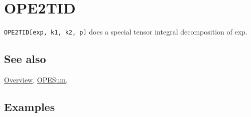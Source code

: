 \documentclass[../FeynCalcManual.tex]{subfiles}
\begin{document}
\hypertarget{ope2tid}{%
\section{OPE2TID}\label{ope2tid}}

\texttt{OPE2TID[\allowbreak{}exp,\ \allowbreak{}k1,\ \allowbreak{}k2,\ \allowbreak{}p]}
does a special tensor integral decomposition of exp.

\subsection{See also}

\hyperlink{toc}{Overview}, \hyperlink{opesum}{OPESum}.

\subsection{Examples}
\end{document}
